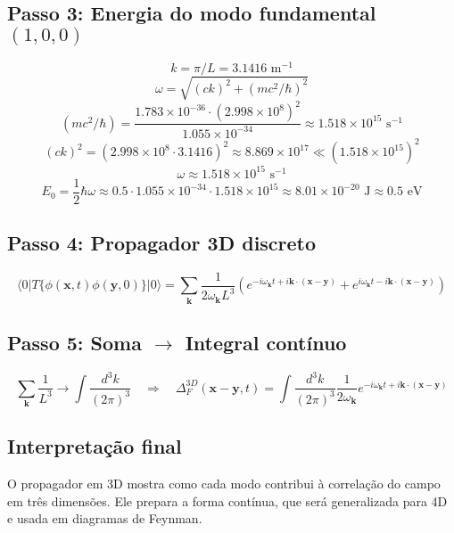 \documentclass[12pt,a4paper]{article}
\begin{document}
\subsection{Passo 3: Energia do modo fundamental \((1,0,0)\)}
\[
k = \pi/L = 3.1416 \text{ m}^{-1}
\]
\[
\omega = \sqrt{(c k)^2 + (m c^2/\hbar)^2}
\]
\[
(m c^2/\hbar) = \frac{1.783\times10^{-36}\cdot (2.998\times10^8)^2}{1.055\times10^{-34}} \approx 1.518\times10^{15}\text{ s}^{-1}
\]
\[
(c k)^2 = (2.998\times10^8 \cdot 3.1416)^2 \approx 8.869\times10^{17} \ll (1.518\times10^{15})^2
\]
\[
\omega \approx 1.518\times10^{15}\text{ s}^{-1}
\]
\[
E_0 = \frac12 \hbar \omega \approx 0.5 \cdot 1.055\times10^{-34} \cdot 1.518\times10^{15} \approx 8.01\times10^{-20} \text{ J} \approx 0.5 \text{ eV}
\]

\subsection{Passo 4: Propagador 3D discreto}
\[
\langle 0 | T\{\phi(\mathbf{x},t)\phi(\mathbf{y},0)\} | 0\rangle =
\sum_\mathbf{k} \frac{1}{2 \omega_\mathbf{k} L^3} \left( e^{-i \omega_\mathbf{k} t + i \mathbf{k}\cdot (\mathbf{x}-\mathbf{y})} + e^{i \omega_\mathbf{k} t - i \mathbf{k}\cdot (\mathbf{x}-\mathbf{y})} \right)
\]

\subsection{Passo 5: Soma $\rightarrow$ Integral contínuo}
\[
\sum_\mathbf{k} \frac{1}{L^3} \to \int \frac{d^3 k}{(2\pi)^3} \quad \Rightarrow \quad
\Delta_F^{3D}(\mathbf{x}-\mathbf{y},t) = \int \frac{d^3 k}{(2\pi)^3} \frac{1}{2 \omega_\mathbf{k}} e^{-i \omega_\mathbf{k} t + i \mathbf{k}\cdot (\mathbf{x}-\mathbf{y})}
\]

\subsection{Interpretação final}
O propagador em 3D mostra como cada modo contribui à correlação do campo em três dimensões. Ele prepara a forma contínua, que será generalizada para 4D e usada em diagramas de Feynman.
\end{document}
